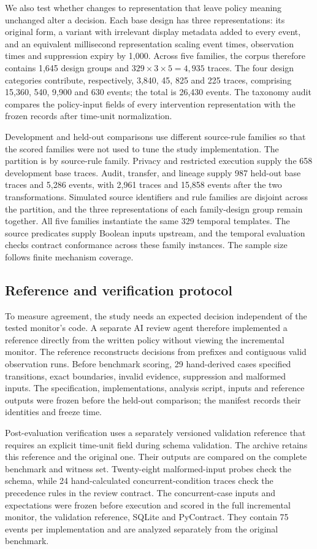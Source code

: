 \documentclass[preprint,11pt]{elsarticle}
\begin{document}
We also test whether changes to representation that leave policy meaning unchanged alter a decision. Each base design has three representations: its original form, a variant with irrelevant display metadata added to every event, and an equivalent millisecond representation scaling event times, observation times and suppression expiry by 1,000. Across five families, the corpus therefore contains 1,645 design groups and $329\times3\times5=4,935$ traces. The four design categories contribute, respectively, 3,840, 45, 825 and 225 traces, comprising 15,360, 540, 9,900 and 630 events; the total is 26,430 events. The taxonomy audit compares the policy-input fields of every intervention representation with the frozen records after time-unit normalization.


Development and held-out comparisons use different source-rule families so that the scored families were not used to tune the study implementation. The partition is by source-rule family. Privacy and restricted execution supply the 658 development base traces. Audit, transfer, and lineage supply 987 held-out base traces and 5,286 events, with 2,961 traces and 15,858 events after the two transformations. Simulated source identifiers and rule families are disjoint across the partition, and the three representations of each family-design group remain together. All five families instantiate the same 329 temporal templates. The source predicates supply Boolean inputs upstream, and the temporal evaluation checks contract conformance across these family instances. The sample size follows finite mechanism coverage.

\subsection{Reference and verification protocol}
To measure agreement, the study needs an expected decision independent of the tested monitor's code. A separate AI review agent therefore implemented a reference directly from the written policy without viewing the incremental monitor. The reference reconstructs decisions from prefixes and contiguous valid observation runs. Before benchmark scoring, 29 hand-derived cases specified transitions, exact boundaries, invalid evidence, suppression and malformed inputs. The specification, implementations, analysis script, inputs and reference outputs were frozen before the held-out comparison; the manifest records their identities and freeze time.

Post-evaluation verification uses a separately versioned validation reference that requires an explicit time-unit field during schema validation. The archive retains this reference and the original one. Their outputs are compared on the complete benchmark and witness set. Twenty-eight malformed-input probes check the schema, while 24 hand-calculated concurrent-condition traces check the precedence rules in the review contract. The concurrent-case inputs and expectations were frozen before execution and scored in the full incremental monitor, the validation reference, SQLite and PyContract. They contain 75 events per implementation and are analyzed separately from the original benchmark.
\end{document}
